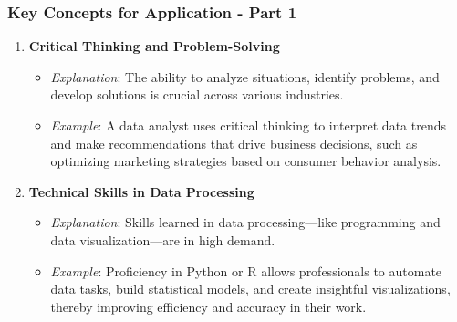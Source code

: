 \documentclass[aspectratio=169]{beamer}
\begin{document}
\begin{frame}[fragile]
    \frametitle{Key Concepts for Application - Part 1}
    \begin{enumerate}
        \item \textbf{Critical Thinking and Problem-Solving}
        \begin{itemize}
            \item \textit{Explanation}: The ability to analyze situations, identify problems, and develop solutions is crucial across various industries.
            \item \textit{Example}: A data analyst uses critical thinking to interpret data trends and make recommendations that drive business decisions, such as optimizing marketing strategies based on consumer behavior analysis.
        \end{itemize}

        \item \textbf{Technical Skills in Data Processing}
        \begin{itemize}
            \item \textit{Explanation}: Skills learned in data processing—like programming and data visualization—are in high demand.
            \item \textit{Example}: Proficiency in Python or R allows professionals to automate data tasks, build statistical models, and create insightful visualizations, thereby improving efficiency and accuracy in their work.
        \end{itemize}
    \end{enumerate}
\end{frame}
\end{document}
